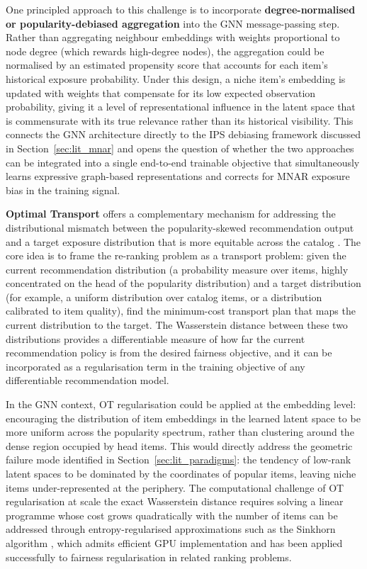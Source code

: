 \documentclass[11pt,a4paper]{report}
\begin{document}
One principled approach to this challenge is to incorporate \textbf{degree-normalised
or popularity-debiased aggregation} into the GNN message-passing step. Rather than
aggregating neighbour embeddings with weights proportional to node degree (which
rewards high-degree nodes), the aggregation could be normalised by an estimated
propensity score \citep{schnabel2016ips} that accounts for each item's historical
exposure probability. Under this design, a niche item's embedding is updated with
weights that compensate for its low expected observation probability, giving it a
level of representational influence in the latent space that is commensurate with
its true relevance rather than its historical visibility. This connects the GNN
architecture directly to the IPS debiasing framework discussed in
Section~\ref{sec:lit_mnar} and opens the question of whether the two approaches
can be integrated into a single end-to-end trainable objective that simultaneously
learns expressive graph-based representations and corrects for MNAR exposure bias
in the training signal.

\textbf{Optimal Transport} offers a complementary mechanism for addressing the
distributional mismatch between the popularity-skewed recommendation output and
a target exposure distribution that is more equitable across the catalog
\citep{villani2008optimal}. The core idea is to frame the re-ranking problem as
a transport problem: given the current recommendation distribution (a probability
measure over items, highly concentrated on the head of the popularity distribution)
and a target distribution (for example, a uniform distribution over catalog items,
or a distribution calibrated to item quality), find the minimum-cost transport plan
that maps the current distribution to the target. The Wasserstein distance between
these two distributions provides a differentiable measure of how far the current
recommendation policy is from the desired fairness objective, and it can be
incorporated as a regularisation term in the training objective of any differentiable
recommendation model.

In the GNN context, OT regularisation could be applied at the embedding level:
encouraging the distribution of item embeddings in the learned latent space to be
more uniform across the popularity spectrum, rather than clustering around the dense
region occupied by head items. This would directly address the geometric failure mode
identified in Section~\ref{sec:lit_paradigms}: the tendency of low-rank latent spaces
to be dominated by the coordinates of popular items, leaving niche items
under-represented at the periphery. The computational challenge of OT regularisation
at scale the exact Wasserstein distance requires solving a linear programme whose
cost grows quadratically with the number of items can be addressed through
entropy-regularised approximations such as the Sinkhorn algorithm
\citep{cuturi2013sinkhorn}, which admits efficient GPU implementation and has been
applied successfully to fairness regularisation in related ranking problems.
\end{document}
